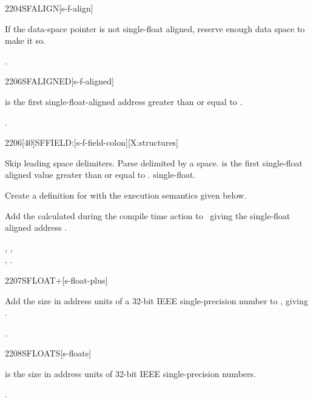 \begin{worddef}{2204}{SFALIGN}[s-f-align]
\item \stack{}{}

	If the data-space pointer is not single-float aligned, reserve
	enough data space to make it so.

\see {}.
\end{worddef}


\begin{worddef}{2206}{SFALIGNED}[s-f-aligned]
\item {}

	 is the first single-float-aligned address greater
	than or equal to .

\see {}.
\end{worddef}


\begin{worddef}{2206}[40]{SFFIELD:}[s-f-field-colon][X:structures]
\item {}

	Skip leading space delimiters. Parse  delimited by
	a space.  is the first single-float aligned value
	greater than or equal to .  
	single-float.

	Create a definition for  with the execution semantics
	given below.

\execute[name]
\cbstart{}
\cbend

	Add the  calculated during the compile time action to
\cbstart{}\cbend\ 
	giving the single-float aligned address
\cbstart{}.\cbend

\see {},
	, \\
	,
	.
\end{worddef}


\begin{worddef}{2207}{SFLOAT+}[s-float-plus]
\item {}

	Add the size in address units of a 32-bit IEEE single-precision
	number to , giving .

\see {}.
\end{worddef}


\begin{worddef}{2208}{SFLOATS}[s-floats]
\item {}

	 is the size in address units of  32-bit IEEE
	single-precision numbers.

\see {}.
\end{worddef}

